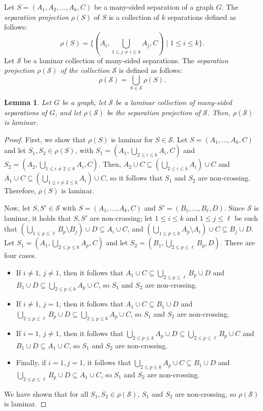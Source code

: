 \documentclass[12pt]{amsart}
\renewcommand{\S}{\mathcal{S}}
\newtheorem{lemma}{Lemma}
\begin{document}
Let $S = (A_1, A_2, \hdots, A_k, C)$ be a many-sided separation of a graph $G$. The {\em separation projection} $\rho(S)$ of $S$ is a collection of $k$ separations defined as follows: $$\rho(S) = \{(A_i, \bigcup_{1 \leq j \neq i \leq k} A_j, C) \mid 1 \leq i \leq k\}.$$ Let $\S$ be a laminar collection of many-sided separations. The {\em separation projection $\rho(\S)$ of the collection $\S$} is defined as follows: 
$$\rho(\S) = \bigcup_{S \in \S} \rho(S).$$
\begin{lemma}
Let $G$ be a graph, let $\S$ be a laminar collection of many-sided separations of $G$, and let $\rho(\S)$ be the separation projection of $\S$. Then, $\rho(\S)$ is laminar.  
\end{lemma}
\begin{proof}
First, we show that $\rho(S)$ is laminar for $S \in \S$. Let $S = (A_1, \hdots, A_k, C)$ and let $S_1, S_2 \in \rho(S)$, with $S_1 = (A_1, \bigcup_{2 \leq i \leq k} A_i, C)$ and $S_2 = (A_2, \bigcup_{1 \leq i \neq 2 \leq k} A_i, C)$. Then, $A_2 \cup C \subseteq \left(\bigcup_{2 \leq i \leq k} A_i\right) \cup C$ and $A_1 \cup C \subseteq \left(\bigcup_{1 \leq i \neq 2 \leq k} A_i\right) \cup C$, so it follows that $S_1$ and $S_2$ are non-crossing. Therefore, $\rho(S)$ is laminar. 

Now, let $S, S' \in \S$ with $S = (A_1, \hdots, A_k, C)$ and $S' = (B_1, \hdots, B_\ell, D)$. Since $\S$ is laminar, it holds that $S, S'$ are non-crossing; let $1 \leq i \leq k$ and $1 \leq j \leq \ell$ be such that $\left(\bigcup_{1 \leq p \leq \ell} B_p \setminus B_j\right) \cup D \subseteq A_i \cup C$, and  $\left(\bigcup_{1 \leq p \leq k} A_p \setminus A_i\right) \cup C \subseteq B_j \cup D$. Let $S_1 = (A_1, \bigcup_{2 \leq p \leq k} A_p, C)$ and let $S_2 = (B_1, \bigcup_{2 \leq p \leq \ell} B_p, D)$. There are four cases. 
\begin{itemize} 
\item If $i \neq 1$, $j \neq 1$, then it follows that $A_1 \cup C \subseteq \bigcup_{2 \leq p \leq \ell} B_p \cup D$ and $B_1 \cup D \subseteq \bigcup_{2 \leq p \leq k} A_p \cup C$, so $S_1$ and $S_2$ are non-crossing. 

\item If $i \neq 1$, $j = 1$, then it follows that $A_1 \cup C \subseteq B_1 \cup D$ and $\bigcup_{2 \leq p \leq \ell} B_p \cup D \subseteq \bigcup_{2 \leq p \leq k} A_p \cup C$, so $S_1$ and $S_2$ are non-crossing. 

\item If $i =1$, $j \neq 1$, then it follows that $\bigcup_{2 \leq p \leq k} A_p \cup D \subseteq \bigcup_{2 \leq p \leq \ell} B_p \cup C$ and $B_1 \cup D \subseteq A_1 \cup C$, so $S_1$ and $S_2$ are non-crossing. 

\item Finally, if $i=1, j=1$, it follows that $\bigcup_{2 \leq p \leq k} A_p \cup C \subseteq B_1 \cup D$ and $\bigcup_{2 \leq p \leq \ell} B_p \cup D \subseteq A_1 \cup C$, so $S_1$ and $S_2$ are non-crossing. 
\end{itemize} 
We have shown that for all $S_1, S_2 \in \rho(\S)$, $S_1$ and $S_2$ are non-crossing, so $\rho(\S)$ is laminar. 
\end{proof}
\end{document}
